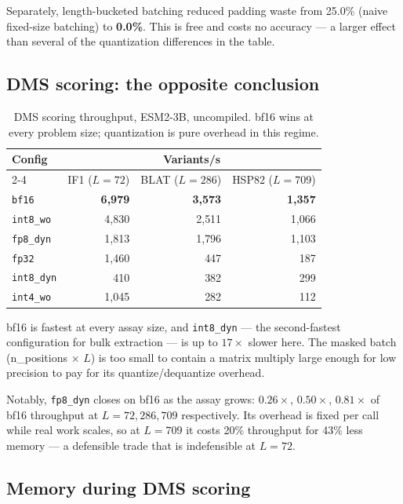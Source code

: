\documentclass[11pt]{article}
\newcommand{\cfg}[1]{\texttt{#1}}
\newcommand{\best}[1]{\textbf{#1}}
\begin{document}
Separately, length-bucketed batching reduced padding waste from 25.0\% (naive
fixed-size batching) to \textbf{0.0\%}. This is free and costs no accuracy ---
a larger effect than several of the quantization differences in the table.

\subsection{DMS scoring: the opposite conclusion}

\begin{table}[htb]
\centering
\caption{DMS scoring throughput, ESM2-3B, uncompiled. bf16 wins at every problem
size; quantization is pure overhead in this regime.}
\small
\begin{tabular}{lrrr}
\toprule
Config & \multicolumn{3}{c}{Variants/s} \\
\cmidrule(lr){2-4}
       & IF1 ($L{=}72$) & BLAT ($L{=}286$) & HSP82 ($L{=}709$) \\
\midrule
\cfg{bf16}      & \best{6{,}979} & \best{3{,}573} & \best{1{,}357} \\
\cfg{int8\_wo}  & 4{,}830 & 2{,}511 & 1{,}066 \\
\cfg{fp8\_dyn}  & 1{,}813 & 1{,}796 & 1{,}103 \\
\cfg{fp32}      & 1{,}460 &   447 &   187 \\
\cfg{int8\_dyn} &   410 &   382 &   299 \\
\cfg{int4\_wo}  & 1{,}045 &   282 &   112 \\
\bottomrule
\end{tabular}
\end{table}

bf16 is fastest at every assay size, and \cfg{int8\_dyn} --- the second-fastest
configuration for bulk extraction --- is up to $17\times$ slower here. The
masked batch (n\_positions $\times$ $L$) is too small to contain a matrix
multiply large enough for low precision to pay for its quantize/dequantize
overhead.

Notably, \cfg{fp8\_dyn} closes on bf16 as the assay grows: $0.26\times$,
$0.50\times$, $0.81\times$ of bf16 throughput at $L = 72, 286, 709$
respectively. Its overhead is fixed per call while real work scales, so at
$L=709$ it costs 20\% throughput for 43\% less memory --- a defensible trade
that is indefensible at $L=72$.

\subsection{Memory during DMS scoring}
\end{document}

